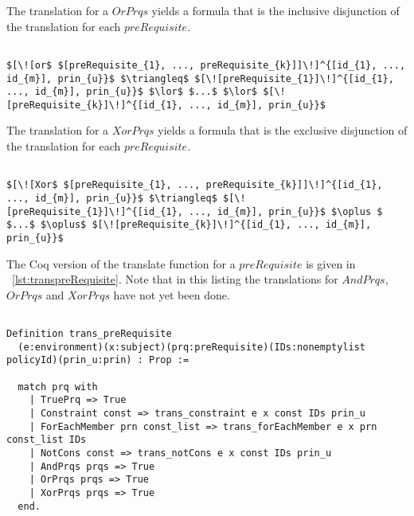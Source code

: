 The translation for a $OrPrqs$ yields a formula that is the inclusive disjunction of the translation for each $preRequisite$.

\lstset{mathescape, language=AST}  
\begin{lstlisting}[frame=single, caption={Prerequisite Translation {$\colon$} Inclusive Disjunction},label={lst:transpreRequisiteOrPrqs}]

$[\![or$ $[preRequisite_{1}, ..., preRequisite_{k}]]\!]^{[id_{1}, ..., id_{m}], prin_{u}}$ $\triangleq$ $[\![preRequisite_{1}]\!]^{[id_{1}, ..., id_{m}], prin_{u}}$ $\lor$ $...$ $\lor$ $[\![preRequisite_{k}]\!]^{[id_{1}, ..., id_{m}], prin_{u}}$

\end{lstlisting}

The translation for a $XorPrqs$ yields a formula that is the exclusive disjunction of the translation for each $preRequisite$.


\lstset{mathescape, language=AST}  
\begin{lstlisting}[frame=single, caption={Prerequisite Translation {$\colon$} Exclusive Disjunction},label={lst:transpreRequisiteXorPrqs}]

$[\![Xor$ $[preRequisite_{1}, ..., preRequisite_{k}]]\!]^{[id_{1}, ..., id_{m}], prin_{u}}$ $\triangleq$ $[\![preRequisite_{1}]\!]^{[id_{1}, ..., id_{m}], prin_{u}}$ $\oplus $ $...$ $\oplus$ $[\![preRequisite_{k}]\!]^{[id_{1}, ..., id_{m}], prin_{u}}$

\end{lstlisting}

The Coq version of the translate function for a $preRequisite$ is given in ~\ref{lst:transpreRequisite}. Note that in this listing the translations for $AndPrqs$, $OrPrqs$ and $XorPrqs$ have not yet been done.

\begin{lstlisting}

Definition trans_preRequisite
  (e:environment)(x:subject)(prq:preRequisite)(IDs:nonemptylist policyId)(prin_u:prin) : Prop := 

  match prq with
    | TruePrq => True
    | Constraint const => trans_constraint e x const IDs prin_u 
    | ForEachMember prn const_list => trans_forEachMember e x prn const_list IDs 
    | NotCons const => trans_notCons e x const IDs prin_u 
    | AndPrqs prqs => True 
    | OrPrqs prqs => True 
    | XorPrqs prqs => True 
  end.
\end{lstlisting}



